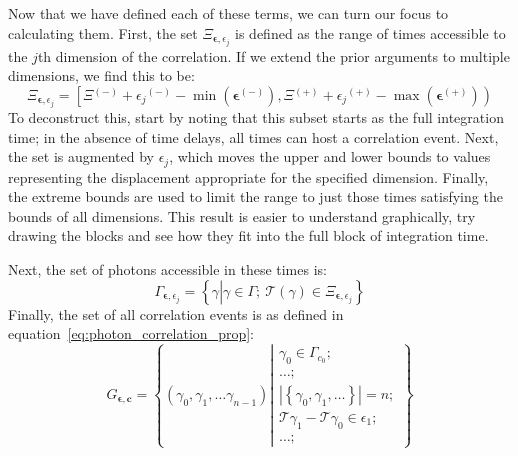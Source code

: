 \documentclass{article}
\newcommand{\braces}[1]{\ensuremath{\left\lbrace #1 \right\rbrace}}
\newcommand{\parens}[1]{\ensuremath{\left( #1 \right)}}
\newcommand{\setbuilder}[2]{\ensuremath{\braces{#1 \left| #2 \right.}}}
\renewcommand{\vec}{\boldsymbol}
\newcommand{\abs}[1]{\ensuremath{\left|#1\right|}}
\newcommand{\channel}{\ensuremath{c}}
\newcommand{\Time}{\ensuremath{\mathcal{T}}}
\newcommand{\photon}{\ensuremath{\gamma}}
\newcommand{\photons}{\ensuremath{\Gamma}}
\newcommand{\integrationtime}{\ensuremath{\Xi}}
\newcommand{\resolution}{\ensuremath{\epsilon}}
\newcommand{\correlationset}{\ensuremath{G}}
\newcommand{\upplus}{\ensuremath{^{(+)}}}
\newcommand{\upminus}{\ensuremath{^{(-)}}}
\begin{document}
Now that we have defined each of these terms, we can turn our focus to calculating them. First, the set $\integrationtime_{\vec{\resolution},\resolution_{j}}$ is defined as the range of times accessible to the $j$th dimension of the correlation. If we extend the prior arguments to multiple dimensions, we find this to be:
\begin{equation}
\integrationtime_{\vec{\resolution},\resolution_{j}} = 
   \left[
   \integrationtime\upminus + \resolution_{j}\upminus - \min{\parens{\vec{\resolution}\upminus}},
   \integrationtime\upplus + \resolution_{j}\upplus - \max{\parens{\vec{\resolution}\upplus}}
   \right)
\end{equation}
To deconstruct this, start by noting that this subset starts as the full integration time; in the absence of time delays, all times can host a correlation event. Next, the set is augmented by $\resolution_{j}$, which moves the upper and lower bounds to values representing the displacement appropriate for the specified dimension. Finally, the extreme bounds are used to limit the range to just those times satisfying the bounds of all dimensions. This result is easier to understand graphically, try drawing the blocks and see how they fit into the full block of integration time.

Next, the set of photons accessible in these times is:
\begin{equation}
\photons_{\vec{\resolution}, \resolution_{j}} = 
   \setbuilder{\photon}
              {\photon\in\photons;~
               \Time\parens{\photon}\in\integrationtime_{\vec{\resolution},\resolution_{j}}}
\end{equation}
Finally, the set of all correlation events is as defined in equation~\ref{eq:photon_correlation_prop}:
\begin{equation}
\label{eq:correlation_set}
\correlationset_{\vec{\resolution},\vec{\channel}} =
    \setbuilder{\parens{\photon_{0},\photon_{1},\ldots\photon_{n-1}}}
               {\begin{aligned}
                \photon_{0}\in\photons_{\channel_{0}};\\
                \ldots;\\
                \abs{\braces{\photon_{0},\photon_{1},\ldots}} = n;\\
                \Time{\photon_{1}}-\Time{\photon_{0}}\in\resolution_{1};\\
                \ldots;
                \end{aligned}}
\end{equation}
\end{document}

